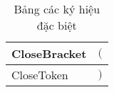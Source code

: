 \begin{table}[h]
    \centering
    \caption{Bảng các ký hiệu đặc biệt}
    \begin{tabular}{|b{4cm}|b{1.5cm}|}
        \hline
        CloseBracket & $($ \\
        \hline
        CloseToken & $)$ \\
        \hline
    \end{tabular}
\end{table}